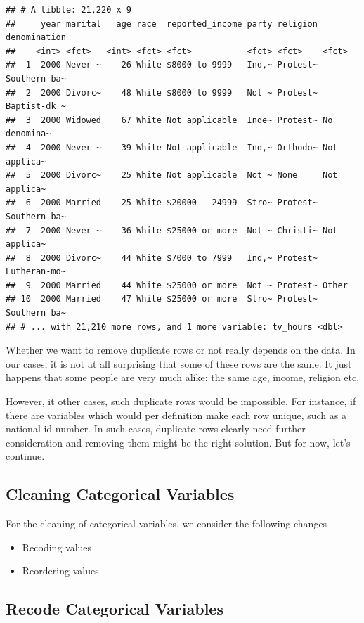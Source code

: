 \documentclass[]{tufte-book}
\providecommand{\tightlist}{%
  \setlength{\itemsep}{0pt}\setlength{\parskip}{0pt}}
\begin{document}
\begin{verbatim}
## # A tibble: 21,220 x 9
##     year marital   age race  reported_income party religion denomination
##    <int> <fct>   <int> <fct> <fct>           <fct> <fct>    <fct>       
##  1  2000 Never ~    26 White $8000 to 9999   Ind,~ Protest~ Southern ba~
##  2  2000 Divorc~    48 White $8000 to 9999   Not ~ Protest~ Baptist-dk ~
##  3  2000 Widowed    67 White Not applicable  Inde~ Protest~ No denomina~
##  4  2000 Never ~    39 White Not applicable  Ind,~ Orthodo~ Not applica~
##  5  2000 Divorc~    25 White Not applicable  Not ~ None     Not applica~
##  6  2000 Married    25 White $20000 - 24999  Stro~ Protest~ Southern ba~
##  7  2000 Never ~    36 White $25000 or more  Not ~ Christi~ Not applica~
##  8  2000 Divorc~    44 White $7000 to 7999   Ind,~ Protest~ Lutheran-mo~
##  9  2000 Married    44 White $25000 or more  Not ~ Protest~ Other       
## 10  2000 Married    47 White $25000 or more  Stro~ Protest~ Southern ba~
## # ... with 21,210 more rows, and 1 more variable: tv_hours <dbl>
\end{verbatim}

Whether we want to remove duplicate rows or not really depends on the data. In our cases, it is not at all surprising that some of these rows are the same. It just happens that some people are very much alike: the same age, income, religion etc.

However, it other cases, such duplicate rows would be impossible. For instance, if there are variables which would per definition make each row unique, such as a national id number. In such cases, duplicate rows clearly need further consideration and removing them might be the right solution. But for now, let's continue.

\hypertarget{cleaning-categorical-variables}{%
\subsection{Cleaning Categorical Variables}\label{cleaning-categorical-variables}}

For the cleaning of categorical variables, we consider the following changes

\begin{itemize}
\tightlist
\item
  Recoding values
\item
  Reordering values
\end{itemize}

\hypertarget{recode-categorical-variables}{%
\subsection{Recode Categorical Variables}\label{recode-categorical-variables}}
\end{document}
